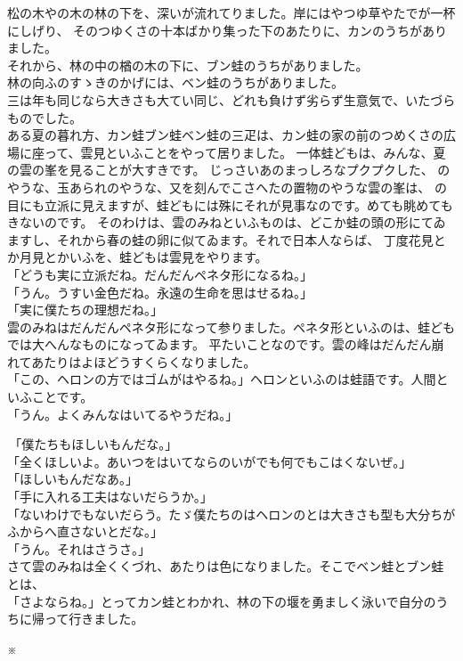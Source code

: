 \documentclass[
a4paper,
10pt,
book]
{tarticle}
\begin{document}
\indent 松の木やの木の林の下を、深いが流れてりました。岸にはやつゆ草やたでが一杯にしげり、
そのつゆくさの十本ばかり集った下のあたりに、カンのうちがありました。\\
\indent それから、林の中の楢の木の下に、ブン蛙のうちがありました。\\
\indent 林の向ふのすゝきのかげには、ベン蛙のうちがありました。\\
\indent 三は年も同じなら大きさも大てい同じ、どれも負けず劣らず生意気で、いたづらものでした。\\
\indent ある夏の暮れ方、カン蛙ブン蛙ベン蛙の三疋は、カン蛙の家の前のつめくさの広場に座って、雲見といふことをやって居りました。
一体蛙どもは、みんな、夏の雲の峯を見ることが大すきです。
じっさいあのまっしろなプクプクした、
のやうな、玉あられのやうな、又を刻んでこさへたの置物のやうな雲の峯は、
の目にも立派に見えますが、蛙どもには殊にそれが見事なのです。めても眺めてもきないのです。
そのわけは、雲のみねといふものは、どこか蛙の頭の形にてゐますし、それから春の蛙の卵に似てゐます。それで日本人ならば、
丁度花見とか月見とかいふを、蛙どもは雲見をやります。\\
「どうも実に立派だね。だんだんペネタ形になるね。」\\
「うん。うすい金色だね。永遠の生命を思はせるね。」\\
「実に僕たちの理想だね。」\\
\indent 雲のみねはだんだんペネタ形になって参りました。ペネタ形といふのは、蛙どもでは大へんなものになってゐます。
平たいことなのです。雲の峰はだんだん崩れてあたりはよほどうすくらくなりました。\\
「この、ヘロンの方ではゴムがはやるね。」ヘロンといふのは蛙語です。人間といふことです。\\
「うん。よくみんなはいてるやうだね。」

\newpage
\setcounter{page}{3}
\thispagestyle{fancy}
\begin{linenumbers}
\noindent \,「僕たちもほしいもんだな。」\\
「全くほしいよ。あいつをはいてならのいがでも何でもこはくないぜ。」\\
「ほしいもんだなあ。」\\
「手に入れる工夫はないだらうか。」\\
「ないわけでもないだらう。たゞ僕たちのはヘロンのとは大きさも型も大分ちがふからへ直さないとだな。」\\
「うん。それはさうさ。」\\
\indent さて雲のみねは全くくづれ、あたりは色になりました。そこでベン蛙とブン蛙とは、\\
「さよならね。」とってカン蛙とわかれ、林の下の堰を勇ましく泳いで自分のうちに帰って行きました。
\end{linenumbers}
\nolinenumbers
\indent \indent \indent \indent \indent \indent \indent \indent \indent \indent ※
\end{document}
